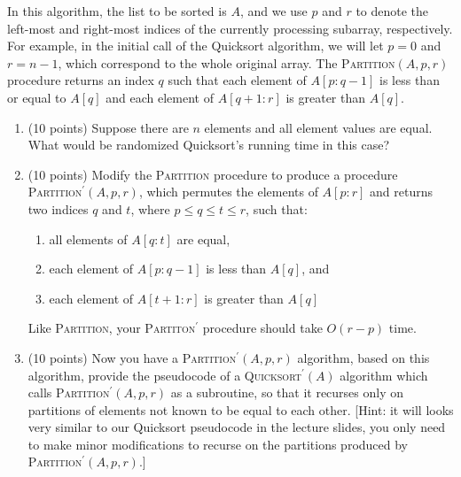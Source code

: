 \documentclass[12pt]{article}
\begin{document}
\begin{enumerate}
	In this algorithm, the list to be sorted is $A$, and we use $p$ and $r$ to denote the left-most and right-most indices of the currently processing subarray, respectively. For example, in the initial call of the Quicksort algorithm, we will let $p=0$ and $r=n-1$, which correspond to the whole original array. The \textsc{Partition}$(A,p,r)$ procedure returns an index $q$ such that each element of $A[p: q-1]$  is less than or equal to $A[q]$ and each element of $A[q+1:r]$ is greater than $A[q]$.
	
	\begin{enumerate}
		\item (10 points) Suppose there are $n$ elements and all element values are equal. What would be randomized Quicksort's running time in this case?
		\item (10 points) Modify the \textsc{Partition} procedure to produce a procedure \textsc{Partition}$^\prime(A,p,r)$, which permutes the elements of $A[p:r]$ and returns two indices $q$ and $t$, where $p\le q\le t\le r$, such that:
			\begin{enumerate}
				\item all elements of $A[q:t]$ are equal,
				\item each element of $A[p:q-1]$ is less than $A[q]$, and
				\item each element of $A[t+1:r]$ is greater than $A[q]$
			\end{enumerate}
		Like \textsc{Partition}, your \textsc{Partiton}$^\prime$ procedure should take $O(r-p)$ time.
		
	\item (10 points) Now you have a \textsc{Partition}$^\prime(A,p,r)$ algorithm, based on this algorithm, provide the pseudocode of a \textsc{Quicksort}$^\prime(A)$ algorithm which calls \textsc{Partition}$^\prime(A,p,r)$ as a subroutine, so that it recurses only on partitions of elements not known to be equal to each other. [Hint: it will looks very similar to our Quicksort pseudocode in the lecture slides, you only need to make minor modifications to recurse on the partitions produced by \textsc{Partition}$^\prime(A,p,r)$.]

	\end{enumerate}
	
	
	
	

\end{enumerate}
\end{document}
